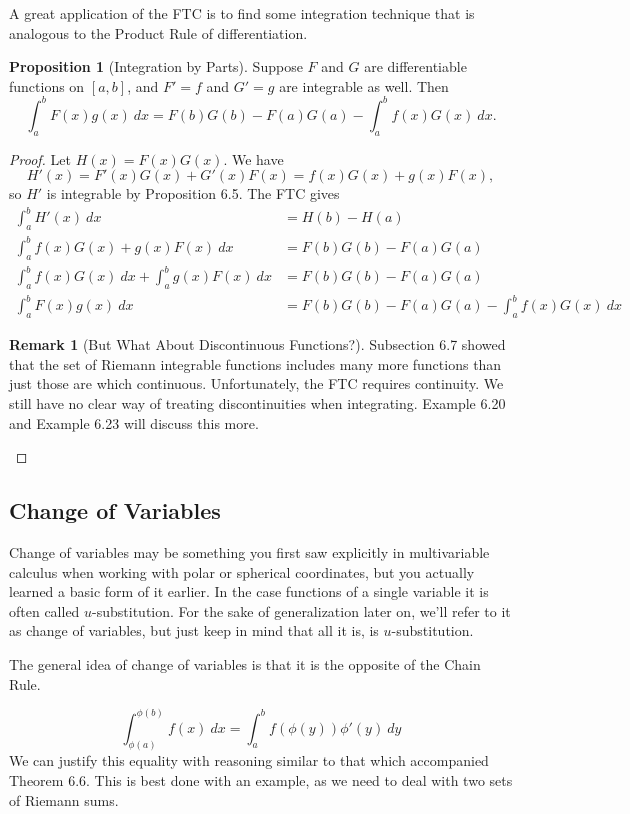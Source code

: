 \documentclass{article}
\theoremstyle{definition}
\newtheorem{proposition}{Proposition}[section]
\newtheorem{remark}{Remark}[section]
\begin{document}
	A great application of the FTC is to find some integration technique that is analogous to the Product Rule of differentiation. 
	\begin{proposition}[Integration by Parts]
		Suppose $ F $ and $ G $ are differentiable functions on $ [a,b] $, and $ F'=f $ and $ G'=g $ are integrable as well. Then $$ \int_{a}^{b}F(x)g(x)\ dx=F(b)G(b)-F(a)G(a)-\int_{a}^{b}f(x)G(x)\ dx.$$
	\end{proposition}
	\begin{proof}
		Let $ H(x)=F(x)G(x) $. We have $$H'(x)=F'(x)G(x)+G'(x)F(x)=f(x)G(x)+g(x)F(x) ,$$ so $ H' $ is integrable by Proposition 6.5. The FTC gives \begin{align*}
			\int_{a}^{b}H'(x)\ dx&=H(b)-H(a)\\
			\int_{a}^{b}f(x)G(x)+g(x)F(x)\ dx&=F(b)G(b)-F(a)G(a)\\
			\int_{a}^{b}f(x)G(x)\ dx+\int_{a}^{b}g(x)F(x)\ dx&=F(b)G(b)-F(a)G(a)\\\int_{a}^{b}F(x)g(x)\ dx&=F(b)G(b)-F(a)G(a)-\int_{a}^{b}f(x)G(x)\ dx
		\end{align*}
		\begin{remark}[But What About Discontinuous Functions?]
			Subsection 6.7 showed that the set of Riemann integrable functions includes many more functions than just those are which continuous. Unfortunately, the FTC requires continuity. We still have no clear way of treating discontinuities when integrating. Example 6.20 and Example 6.23 will discuss this more.
		\end{remark}
	\end{proof}
	\subsection{Change of Variables}
	Change of variables may be something you first saw explicitly in multivariable calculus when working with polar or spherical coordinates, but you actually learned a basic form of it earlier. In the case functions of a single variable it is often called $ u $-substitution. For the sake of generalization later on, we'll refer to it as change of variables, but just keep in mind that all it is, is $u$-substitution. 
	
	The general idea of change of variables is that it is the opposite of the Chain Rule. 
	
	$$ \int_{\phi(a)}^{\phi(b)}f(x)\ dx=\int_{a}^{b}f(\phi(y))\phi'(y)\ dy$$
	We can justify this equality with reasoning similar to that which accompanied Theorem 6.6. This is best done with an example, as we need to deal with two sets of Riemann sums. 
	
\end{document}
